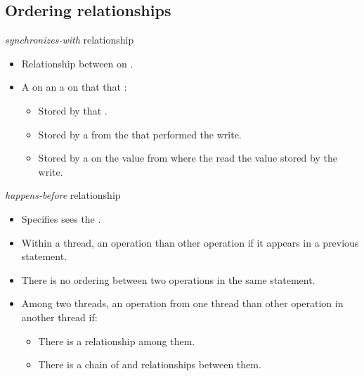 \subsection{Ordering relationships}

\begin{frame}[t]{\emph{synchronizes-with} relationship}
\begin{itemize}
  \item Relationship between  on .

  \item A  on an  
         a  on that
         that :
    \begin{itemize}

      \item Stored by that .

      \item Stored by a  from the
             that performed the write.

      \item Stored by a  
             on the value from
             where the  
            read the value stored by the write.
    \end{itemize}
\end{itemize}
\end{frame}


\begin{frame}[t]{\emph{happens-before} relationship}
\begin{itemize}
  \item Specifies  sees the .

  \item Within a thread,
        an operation  than other operation
        if it appears in a previous statement.

  \item There is no ordering between two operations in the same statement.

  \item Among two threads,
        an operation from one thread  than other operation in
        another thread if:
    \begin{itemize}
      \item There is a  relationship among them.
      \item There is a chain of  and  
            relationships between them.
    \end{itemize}
\end{itemize}
\end{frame}

